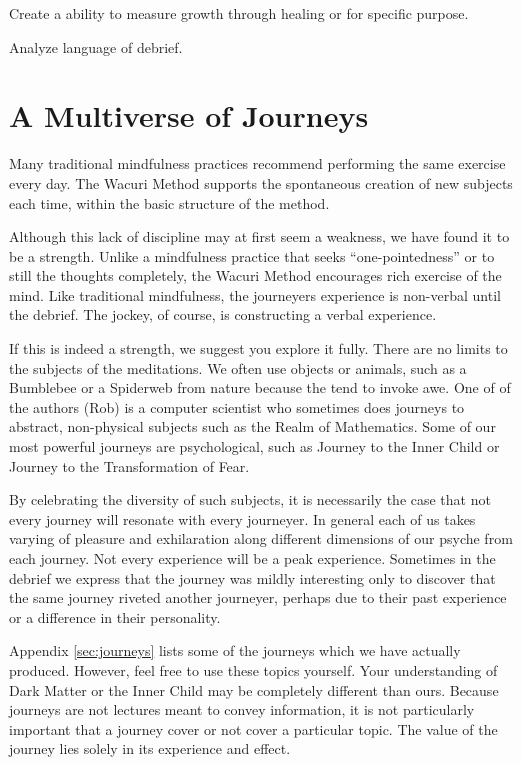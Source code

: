 \documentclass[12pt]{book}
\begin{document}
Create a ability to measure growth through healing or for specific
purpose.

Analyze language of debrief.

\chapter{ A Multiverse of Journeys}

Many traditional mindfulness practices recommend performing the
same exercise every day. The Wacuri Method supports the
spontaneous creation of new subjects each time, within the
basic structure of the method.

Although this lack of discipline may at first seem a weakness,
we have found it to be a strength. Unlike a mindfulness practice
that seeks ``one-pointedness'' or to still the thoughts completely,
the Wacuri Method encourages rich exercise of the mind. Like
traditional mindfulness, the journeyers experience is non-verbal
until the debrief. The jockey, of course, is constructing a
verbal experience.

If this is indeed a strength, we suggest you explore it
fully. There are no limits to the subjects of the meditations.
We often use objects or animals, such as a Bumblebee or a
Spiderweb from nature because the
tend to invoke awe. One of of the authors (Rob) is a
computer scientist who sometimes does journeys to abstract,
non-physical subjects such as the Realm of Mathematics.
Some of our most powerful journeys are psychological, such
as Journey to the Inner Child or Journey to the Transformation
of Fear.

By celebrating the diversity of such subjects, it is necessarily
the case that not every journey will resonate with every journeyer.
In general each of us takes varying of pleasure and exhilaration
along different dimensions of our psyche from each journey.
Not every experience will be a peak experience. Sometimes in
the debrief we express that the journey was mildly interesting
only to discover that the same journey riveted another journeyer,
perhaps due to their past experience or a difference in their
personality.

Appendix \ref{sec:journeys} lists some of the journeys which we have actually
produced. However, feel free to use these topics yourself. Your
understanding of Dark Matter or the Inner Child may be completely
different than ours. Because journeys are not lectures meant
to convey information, it is not particularly important that
a journey cover or not cover a particular topic. The value
of the journey lies solely in its experience and effect.
\end{document}
